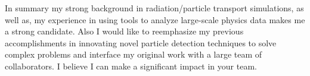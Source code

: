 \documentclass[11pt]{article} %
\begin{document}
In summary my strong background in radiation/particle transport simulations, as
well as, my experience in using tools to analyze large-scale physics data makes
me a strong candidate. Also I would like to reemphasize my previous
accomplishments in innovating novel particle detection techniques to solve
complex problems and interface my original work with a large team of
collaborators. I believe I can make a significant impact in your team.

%
%
%
\end{document}
